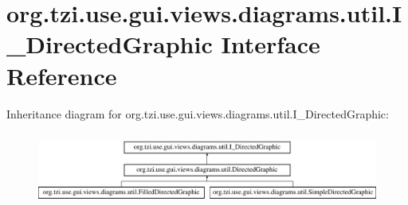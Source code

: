 \hypertarget{interfaceorg_1_1tzi_1_1use_1_1gui_1_1views_1_1diagrams_1_1util_1_1_i___directed_graphic}{\section{org.\-tzi.\-use.\-gui.\-views.\-diagrams.\-util.\-I\-\_\-\-Directed\-Graphic Interface Reference}
\label{interfaceorg_1_1tzi_1_1use_1_1gui_1_1views_1_1diagrams_1_1util_1_1_i___directed_graphic}
}
Inheritance diagram for org.\-tzi.\-use.\-gui.\-views.\-diagrams.\-util.\-I\-\_\-\-Directed\-Graphic\-:\begin{figure}[H]
\begin{center}
\leavevmode
\includegraphics[height=2.434783cm]{interfaceorg_1_1tzi_1_1use_1_1gui_1_1views_1_1diagrams_1_1util_1_1_i___directed_graphic}
\end{center}
\end{figure}
